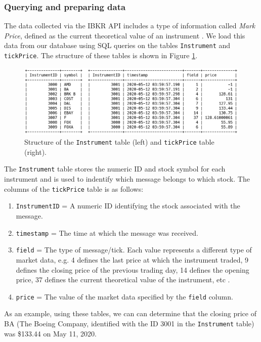 \documentclass[a4paper,oneside,onecolumn,12pt]{book}
\begin{document}
		\subsubsection{Querying and preparing data}
		The data collected via the IBKR API includes a type of information called \textit{Mark Price}, defined as the current theoretical value of an instrument \cite{TT}. We load this data from our database using SQL queries on the tables \texttt{Instrument} and \texttt{tickPrice}. The structure of these tables is shown in Figure \ref{fig:instrument_tick_price}.
		\begin{figure}[H]
		\begin{center}
			\includegraphics[width=\linewidth]{kep/table_instrument_tick_price.png}
			\caption{Structure of the \texttt{Instrument} table (left) and \texttt{tickPrice} table (right).}
			\label{fig:instrument_tick_price}
		\end{center}
		\end{figure}
		The \texttt{Instrument} table stores the numeric ID and stock symbol for each instrument and is used to indentify which message belongs to which stock. The columns of the \texttt{tickPrice} table is as follows:
		\begin{enumerate}
			\item \texttt{InstrumentID} = A numeric ID identifying the stock associated with the message.
			\item \texttt{timestamp} = The time at which the message was received.
			\item \texttt{field} = The type of message/tick. Each value represents a different type of market data, e.g. 4 defines the last price at which the instrument traded, 9 defines the closing price of the previous trading day, 14 defines the opening price, 37 defines the current theoretical value of the instrument, etc \cite{TT}. 
			\item \texttt{price} = The value of the market data specified by the \texttt{field} column.
		\end{enumerate}
		
		As an example, using these tables, we can can determine that the closing price of BA (The Boeing Company, identified with the ID 3001 in the \texttt{Instrument} table) was \$133.44 on May 11, 2020.
\end{document}

